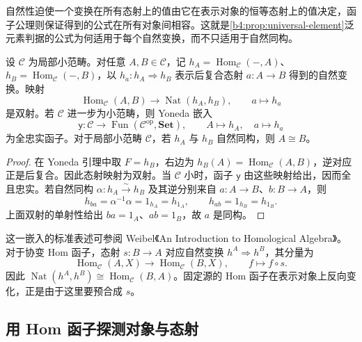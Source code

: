 自然性迫使一个变换在所有态射上的值由它在表示对象的恒等态射上的值决定，函子公理则保证得到的公式在所有对象间相容。这就是\cref{b4:prop:universal-element}泛元素判据的公式为何适用于每个自然变换，而不只适用于自然同构。

\begin{corollary}\label{b4:cor:yoneda-embedding}
	设 \(\mathcal C\) 为局部小范畴。对任意 \(A,B\in\mathcal C\)，记 \(h_A=\operatorname{Hom}_{\mathcal C}(-,A)\)、\(h_B=\operatorname{Hom}_{\mathcal C}(-,B)\)，以 \(h_a:h_A\Rightarrow h_B\) 表示后复合态射 \(a:A\rightarrow B\) 得到的自然变换。映射
	\[
		\operatorname{Hom}_{\mathcal C}(A,B)\longrightarrow\operatorname{Nat}(h_A,h_B), \qquad a\longmapsto h_a
	\]
	是双射。若 \(\mathcal C\) 进一步为小范畴，则 Yoneda 嵌入
	\[
		\mathsf y:\mathcal C\longrightarrow\operatorname{Fun}(\mathcal C^{\mathrm{op}},\mathbf{Set}), \qquad A\longmapsto h_A,\quad a\longmapsto h_a
	\]
	为全忠实函子。对于局部小范畴 \(\mathcal C\)，若 \(h_A\) 与 \(h_B\) 自然同构，则 \(A\cong B\)。
\end{corollary}
\begin{proof}
	在 Yoneda 引理中取 \(F=h_B\)，右边为 \(h_B(A)=\operatorname{Hom}_{\mathcal C}(A,B)\)，逆对应正是后复合。因此态射映射为双射。当 \(\mathcal C\) 小时，函子 \(\mathsf y\) 由这些映射给出，因而全且忠实。若自然同构 \(\alpha:h_A\xrightarrow{\sim}h_B\) 及其逆分别来自 \(a:A\rightarrow B\)、\(b:B\rightarrow A\)，则
	\[
		h_{ba}=\alpha^{-1}\alpha=1_{h_A}=h_{1_A},\qquad h_{ab}=1_{h_B}=h_{1_B}.
	\]
	上面双射的单射性给出 \(ba=1_A\)、\(ab=1_B\)，故 \(a\) 是同构。
\end{proof}

这一嵌入的标准表述可参阅 Weibel《An Introduction to Homological Algebra》\cite[Example A.3.4]{Weibel1994HomologicalAlgebra}。对于协变 Hom 函子，态射 \(s:B\rightarrow A\) 对应自然变换 \(h^A\Rightarrow h^B\)，其分量为
\[
	\operatorname{Hom}_{\mathcal C}(A,X)\longrightarrow \operatorname{Hom}_{\mathcal C}(B,X),\qquad f\longmapsto f\circ s.
\]
因此 \(\operatorname{Nat}(h^A,h^B)\cong\operatorname{Hom}_{\mathcal C}(B,A)\)。固定源的 Hom 函子在表示对象上反向变化，正是由于这里要预合成 \(s\)。

\subsection{用 Hom 函子探测对象与态射}
\label{b4:subsec:0302:03}

